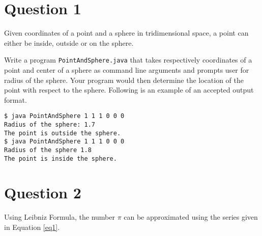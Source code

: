 %
%
%
%

\section*{Question 1}
Given coordinates of a point and a sphere in tridimensional space, a point can either be inside, outside or on the sphere.

Write a program \texttt{PointAndSphere.java} that takes respectively coordinates of a point and center of a sphere as command line arguments and prompts user for radius of the sphere.
Your program would then determine the location of the point with respect to the sphere.
Following is an example of an accepted output format.

\begin{verbatim}
$ java PointAndSphere 1 1 1 0 0 0
Radius of the sphere: 1.7
The point is outside the sphere.
$ java PointAndSphere 1 1 1 0 0 0
Radius of the sphere 1.8
The point is inside the sphere.
\end{verbatim}

\section*{Question 2}
Using Leibniz Formula, the number $\pi$ can be approximated using the series given in Equation \ref{eq1}.

